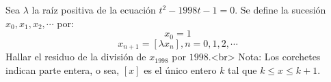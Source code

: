 Sea $\lambda$ la raíz positiva de la ecuación $t^2 - 1998t - 1 = 0$. Se define la sucesión $x_0, x_1, x_2, \cdots$ por:
\[ x_0 = 1 \]
\[ x_{n+1} = [\lambda x_n], n=0,1,2,\cdots \]
Hallar el residuo de la división de $x_1998$ por $1998$.<br>
Nota: Los corchetes indican parte entera, o sea, $[x]$ es el único entero $k$ tal que $k \leq x \leq k+1$.
